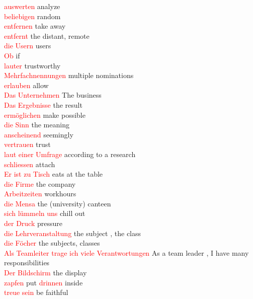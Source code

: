 \documentclass{article}
\begin{document}
\begin{multicols}{2}
	\textcolor{red}{auswerten} analyze \\
	\textcolor{red}{beliebigen} random\\
	\textcolor{red}{entfernen} take away\\
	\textcolor{red}{entfernt}  the distant, remote\\
	\textcolor{red}{die Usern} users\\
	\textcolor{red}{Ob} if\\
	\textcolor{red}{lauter} trustworthy\\
	\textcolor{red}{Mehrfachnennungen} multiple nominations\\
	\textcolor{red}{erlauben} allow\\
	\textcolor{red}{Das Unternehmen} The business\\
	\textcolor{red}{Das Ergebnisse} the result\\
	\textcolor{red}{ermöglichen} make possible\\
	\textcolor{red}{die Sinn} the meaning\\
	\textcolor{red}{anscheinend} seemingly\\
	\textcolor{red}{vertrauen} trust\\
	\textcolor{red}{laut einer Umfrage} according to a research\\
	\textcolor{red}{schliessen} attach\\
	\textcolor{red}{Er ist zu Tisch} eats at the table\\
	\textcolor{red}{die Firme} the company\\
	\textcolor{red}{Arbeitzeiten} workhours\\
	\textcolor{red}{die Mensa} the (university) canteen\\
	\textcolor{red}{sich lümmeln uns} chill out\\
	\textcolor{red}{der Druck} pressure\\
	\textcolor{red}{die Lehrveranstaltung} the subject , the class\\
	\textcolor{red}{die Föcher} the subjects, classes\\
	\textcolor{red}{Als Teamleiter trage ich viele Verantwortungen} As a team leader , I have many responsibilities\\
	\textcolor{red}{Der Bildschirm} the display\\
	\textcolor{red}{zapfen} put
	\textcolor{red}{drinnen} inside\\
	\textcolor{red}{treue sein} be faithful \\\\
	

\end{multicols}
\end{document}
